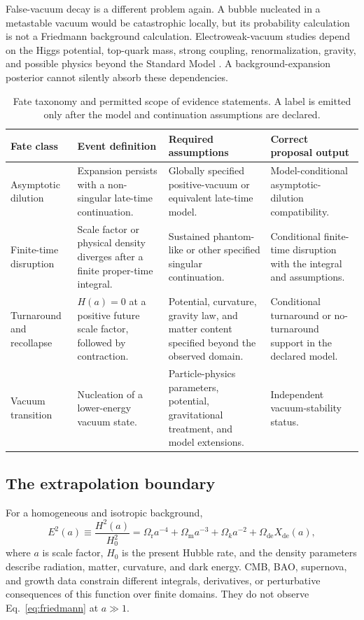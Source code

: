 \documentclass[conference]{IEEEtran}
\begin{document}
False-vacuum decay is a different problem again. A bubble nucleated in a metastable vacuum would be catastrophic locally, but its probability calculation is not a Friedmann background calculation. Electroweak-vacuum studies depend on the Higgs potential, top-quark mass, strong coupling, renormalization, gravity, and possible physics beyond the Standard Model \cite{markkanen2018,chigusa2018}. A background-expansion posterior cannot silently absorb these dependencies.

\begin{table}[t]
\caption{Fate taxonomy and permitted scope of evidence statements. A label is emitted only after the model and continuation assumptions are declared.}
\label{tab:taxonomy}
\centering
\footnotesize
\setlength{\tabcolsep}{3pt}
\begin{tabular}{p{} p{} p{} p{}}
\hline
\textbf{Fate class} & \textbf{Event definition} & \textbf{Required assumptions} & \textbf{Correct proposal output}\\
\hline
Asymptotic dilution & Expansion persists with a non-singular late-time continuation. & Globally specified positive-vacuum or equivalent late-time model. & Model-conditional asymptotic-dilution compatibility.\\
Finite-time disruption & Scale factor or physical density diverges after a finite proper-time integral. & Sustained phantom-like or other specified singular continuation. & Conditional finite-time disruption with the integral and assumptions.\\
Turnaround and recollapse & \(H(a)=0\) at a positive future scale factor, followed by contraction. & Potential, curvature, gravity law, and matter content specified beyond the observed domain. & Conditional turnaround or no-turnaround support in the declared model.\\
Vacuum transition & Nucleation of a lower-energy vacuum state. & Particle-physics parameters, potential, gravitational treatment, and model extensions. & Independent vacuum-stability status.\\
\hline
\end{tabular}
\end{table}

\subsection{The extrapolation boundary}

For a homogeneous and isotropic background,
\begin{equation}
 E^2(a) \equiv \frac{H^2(a)}{H_0^2}
 = \Omega_{\mathrm r}a^{-4}+\Omega_{\mathrm m}a^{-3}
 +\Omega_k a^{-2}+\Omega_{\mathrm{de}}X_{\mathrm{de}}(a),
\label{eq:friedmann}
\end{equation}
where \(a\) is scale factor, \(H_0\) is the present Hubble rate, and the density parameters describe radiation, matter, curvature, and dark energy. CMB, BAO, supernova, and growth data constrain different integrals, derivatives, or perturbative consequences of this function over finite domains. They do not observe Eq.~\eqref{eq:friedmann} at \(a\gg1\).
\end{document}
